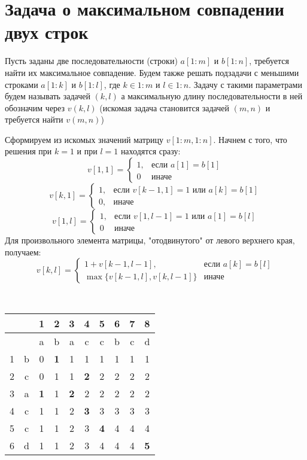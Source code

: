 \documentclass[discrete.tex]{subfiles}
\begin{document}
  \section{Задача о максимальном совпадении двух строк}

  \begin{task}
    Пусть заданы две последовательности (строки) $a[1:m]$ и $b[1:n]$, требуется найти их максимальное совпадение. Будем также решать подзадачи с меньшими строками $a[1:k]$ и $b[1:l]$, где $k \in 1:m$ и $l \in 1:n$. Задачу с такими параметрами будем называть задачей $(k,l)$ а максимальную длину последовательности в ней обозначим через $v(k,l)$ (искомая задача становится задачей $(m,n)$ и требуется найти $v(m,n)$)

    Сформируем из искомых значений матрицу $v[1:m,1:n]$. Начнем с того, что решения при $k=1$ и при $l=1$ находятся сразу:
    \[v[1,1] = \begin{cases}
      1, & \text{если }a[1]=b[1]\\
      0 & \text{иначе}
    \end{cases}\]
    \[v[k,1] = \begin{cases}
      1, & \text{если }v[k-1,1]=1 \text{ или } a[k]=b[1]\\
      0, & \text{иначе}
    \end{cases}\]
    \[v[1,l] = \begin{cases}
      1, & \text{если }v[1,l-1]=1 \text{ или } a[1]=b[l]\\
      0 & \text{иначе}
    \end{cases}\]
    Для произвольного элемента матрицы, "отодвинутого"{} от левого верхнего края, получаем:
    \[v[k,l] = \begin{cases}
      1 + v[k-1,l-1], & \text{если }a[k]=b[l]\\
      \max\{v[k-1,l],v[k,l-1]\} & \text{иначе}
    \end{cases}\]
  \end{task}

  \begin{example} \ \\
    \begin{tabular}{c|c|cccccccc}
        &   & 1 & 2 & 3 & 4 & 5 & 6 & 7 & 8\\
        \hline
        &   & a & b & a & c & c & b & c & d\\
      \hline
      1 & b & 0 & \bfseries 1 & 1 & 1 & 1 & 1 & 1 & 1\\
      2 & c & 0 & 1 & 1 & \bfseries 2 & 2 & 2 & 2 & 2\\
      3 & a & \bfseries 1 & 1 & \bfseries 2 & 2 & 2 & 2 & 2 & 2\\
      4 & c & 1 & 1 & 2 & \bfseries 3 & 3 & 3 & 3 & 3\\
      5 & c & 1 & 1 & 2 & 3 & \bfseries 4 & 4 & 4 & 4\\
      6 & d & 1 & 1 & 2 & 3 & 4 & 4 & 4 & \bfseries 5
    \end{tabular}
  \end{example}
\end{document}
